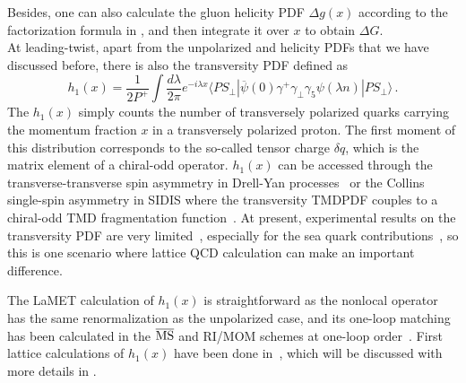 Besides, one can also calculate the gluon helicity PDF $\Delta g(x)$
according to the factorization formula in , and then integrate it over $x$ to obtain $\Delta G$.\\

At leading-twist, apart from the unpolarized
and helicity PDFs that we have discussed before, there is also the transversity
PDF defined as~\cite{Jaffe:1991kp,Jaffe:1991ra}
\begin{equation}
	h_1(x)\! =\! \frac{1}{2P^+}\!\int \frac{d\lambda}{2\pi}
	e^{-i\lambda x} \langle PS_\perp|\overline{\psi}(0)\gamma^+\gamma_\perp\gamma_5\psi(\lambda n)|PS_\perp\rangle \,.
\end{equation}
The $h_1(x)$ simply counts the number of transversely polarized quarks carrying
the momentum fraction $x$ in a transversely polarized proton.
The first moment of this distribution corresponds to the
so-called tensor charge $\delta q$, which is the matrix element of a chiral-odd operator. $h_1(x)$ can be accessed through the transverse-transverse spin asymmetry in Drell-Yan processes~\cite{Ralston:1979ys,Jaffe:1991kp,Jaffe:1991ra} or the Collins single-spin asymmetry in SIDIS where the transversity TMDPDF couples to a chiral-odd TMD fragmentation function~\cite{Collins:1992kk}.
At present, experimental results on the transversity PDF are very
limited~\cite{Barone:2001sp,Kang:2015msa,Lin:2017stx,Radici:2018iag,Cammarota:2020qcw}, especially for the sea quark contributions~\cite{Chang:2014jba}, so this is one scenario where lattice
QCD calculation can make an important difference.

The LaMET calculation of $h_1(x)$ is straightforward as the nonlocal operator has the same renormalization as the unpolarized case, and its one-loop matching has been calculated in the ${\overline{\rm MS}}$ and RI/MOM schemes at one-loop order~\cite{Alexandrou:2018eet,Liu:2018hxv}. First lattice calculations of $h_1(x)$ have been done in~\cite{Chen:2016utp,Alexandrou:2018eet,Liu:2018hxv}, which will be discussed with more details in .


